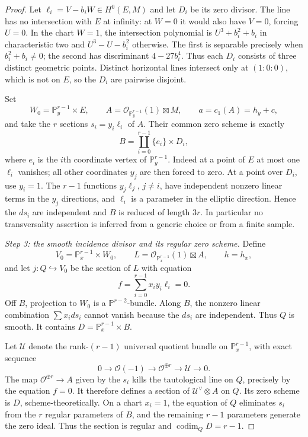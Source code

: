 \begin{proof}
Let $\ell_i=V-b_iW\in H^0(E,M)$ and let $D_i$ be its zero divisor.
The line has no intersection with $E$ at infinity: at $W=0$ it would
also have $V=0$, forcing $U=0$. In the chart $W=1$, the intersection
polynomial is $U^3+b_i^2+b_i$ in characteristic two and
$U^3-U-b_i^2$ otherwise. The first is separable precisely when
$b_i^2+b_i\ne0$; the second has discriminant $4-27b_i^4$.
Thus each $D_i$ consists of three distinct geometric points. Distinct
horizontal lines intersect only at $(1:0:0)$, which is not on $E$,
so the $D_i$ are pairwise disjoint.

Set
\[
 W_0=\mathbb P_y^{r-1}\times E,\qquad
 A=\mathcal O_{\mathbb P_y^{r-1}}(1)\boxtimes M,
 \qquad a=c_1(A)=h_y+c,
\]
and take the $r$ sections $s_i=y_i\ell_i$ of $A$.
Their common zero scheme is exactly
\[
 B=\coprod_{i=0}^{r-1}\{e_i\}\times D_i,
\]
where $e_i$ is the $i$th coordinate vertex of $\mathbb P_y^{r-1}$.
Indeed at a point of $E$ at most one $\ell_i$ vanishes; all other
coordinates $y_j$ are then forced to zero. At a point over $D_i$,
use $y_i=1$. The $r-1$ functions $y_j\ell_j$, $j\ne i$, have
independent nonzero linear terms in the $y_j$ directions, and
$\ell_i$ is a parameter in the elliptic direction. Hence the
$ds_i$ are independent and $B$ is reduced of length $3r$.
In particular no transversality assertion is inferred from a generic
choice or from a finite sample.

\emph{Step 3: the smooth incidence divisor and its regular zero scheme.}
Define
\[
 V_0=\mathbb P_x^{r-1}\times W_0,\qquad
 L=\mathcal O_{\mathbb P_x^{r-1}}(1)\boxtimes A,
 \qquad h=h_x,
\]
and let $j:Q\hookrightarrow V_0$ be the section of $L$ with equation
\[
                    f=\sum_{i=0}^{r-1}x_i y_i\ell_i=0.
\]
Off $B$, projection to $W_0$ is a $\mathbb P^{r-2}$-bundle.
Along $B$, the nonzero linear combination $\sum x_i ds_i$ cannot
vanish because the $ds_i$ are independent. Thus $Q$ is smooth.
It contains $D=\mathbb P_x^{r-1}\times B$.

Let $\mathcal U$ denote the rank-$(r-1)$ universal quotient bundle
on $\mathbb P_x^{r-1}$, with exact sequence
\[
 0\longrightarrow\mathcal O(-1)\longrightarrow
       \mathcal O^{\oplus r}\longrightarrow\mathcal U
                                                    \longrightarrow0.
\]
The map $\mathcal O^{\oplus r}\to A$ given by the $s_i$ kills
the tautological line on $Q$, precisely by the equation $f=0$.
It therefore defines a section of
$\mathcal U^\vee\otimes A$ on $Q$. Its zero scheme is $D$,
scheme-theoretically. On a chart $x_i=1$, the equation of $Q$
eliminates $s_i$ from the $r$ regular parameters of $B$, and the
remaining $r-1$ parameters generate the zero ideal. Thus the section
is regular and $\operatorname{codim}_Q D=r-1$.


\end{proof}
